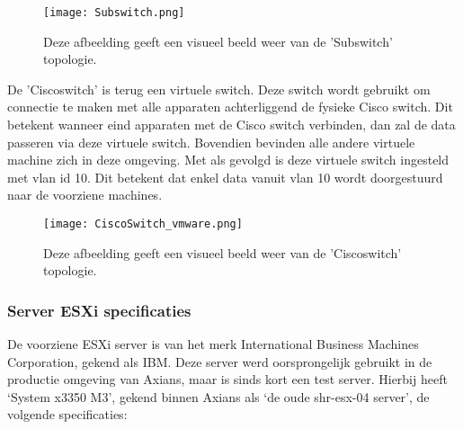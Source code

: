 \begin{figure}[H]
	\centering
	\texttt{[image: Subswitch.png]}
	\caption{Deze afbeelding geeft een visueel beeld weer van de 'Sub\textunderscore switch' topologie.}
\end{figure}

\newline
De 'Cisco\textunderscore switch'  is terug een virtuele switch. Deze switch wordt gebruikt om connectie te maken met alle apparaten achterliggend de fysieke Cisco switch. Dit betekent wanneer eind apparaten met de Cisco switch verbinden, dan zal de data passeren via deze virtuele switch. Bovendien bevinden alle andere virtuele machine zich in deze omgeving. Met als gevolgd is deze virtuele switch  ingesteld met vlan id 10. Dit betekent dat enkel data vanuit vlan 10 wordt doorgestuurd naar de voorziene machines.

\begin{figure}[H]
	\centering
	\texttt{[image: CiscoSwitch\_vmware.png]}
	\caption{Deze afbeelding geeft een visueel beeld weer van de 'Cisco\textunderscore switch' topologie.}
\end{figure}

\subsubsection{Server ESXi specificaties}
De voorziene ESXi server is van het merk International Business Machines Corporation, gekend als IBM. Deze server werd oorsprongelijk gebruikt in de productie omgeving van Axians, maar is sinds kort een test server. 
\newline
\newline
Hierbij heeft ‘System x3350 M3’, gekend binnen Axians als ‘de oude shr-esx-04 server’, de volgende specificaties:

